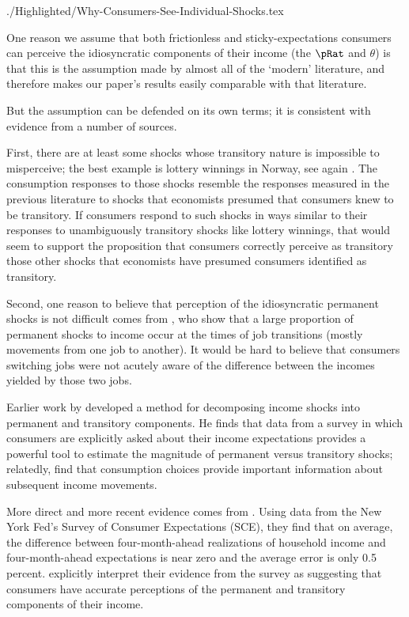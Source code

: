 \begin{verbatimwrite}{./Highlighted/Why-Consumers-See-Individual-Shocks.tex}

  One reason we assume that both frictionless and sticky-expectations consumers can perceive the idiosyncratic components of their income (the $\pRat$ and $\theta$) is that this is the assumption made by almost all of the `modern' literature, and therefore makes our paper's results easily comparable with that literature.

  But the assumption can be defended on its own terms; it is consistent with evidence from a number of sources.

  First, there are at least some shocks whose transitory nature is impossible to misperceive; the best example is lottery winnings in Norway, see again \cite{fhnMPC}.  The consumption responses to those shocks resemble the responses measured in the previous literature to shocks that economists presumed that consumers knew to be transitory.  If consumers respond to such shocks in ways similar to their responses to unambiguously transitory shocks like lottery winnings, that would seem to support the proposition that consumers correctly perceive as transitory those other shocks that economists have presumed consumers identified as transitory.

  Second, one reason to believe that perception of the idiosyncratic permanent shocks is not difficult comes from \cite{lmpPermShocks}, who show that a large proportion of permanent shocks to income occur at the times of job transitions (mostly movements from one job to another).  It would be hard to believe that consumers switching jobs were not acutely aware of the difference between the incomes yielded by those two jobs.

  Earlier work by \cite{pistaferriSuperior} developed a method for decomposing income shocks into permanent and transitory components.  He finds that data from a survey in which consumers are explicitly asked about their income expectations provides a powerful tool to estimate the magnitude of permanent versus transitory shocks; relatedly, \cite{gsInferring} find that consumption choices provide important information about subsequent income movements.

  More direct and more recent evidence comes from \cite{kmpIncomeExpectations}.  Using data from the New York Fed's Survey of Consumer Expectations (SCE), they find that on average, the difference between four-month-ahead realizations of household income and four-month-ahead expectations is near zero and the average error is only 0.5 percent. \cite{kmpIncomeExpectations} explicitly interpret their evidence from the survey as suggesting that consumers have accurate perceptions of the permanent and transitory components of their income.


\end{verbatimwrite}
